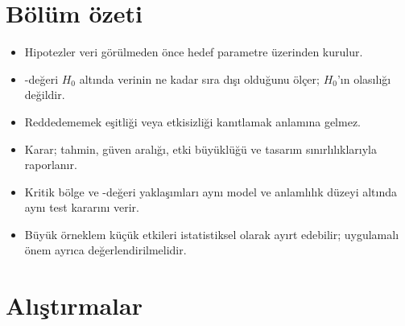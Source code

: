 



\section{Bölüm özeti}

\begin{itemize}
  \item Hipotezler veri görülmeden önce hedef parametre üzerinden kurulur.
  \item \pval-değeri $H_0$ altında verinin ne kadar sıra dışı olduğunu ölçer; $H_0$'ın olasılığı değildir.
  \item Reddedememek eşitliği veya etkisizliği kanıtlamak anlamına gelmez.
  \item Karar; tahmin, güven aralığı, etki büyüklüğü ve tasarım sınırlılıklarıyla raporlanır.
  \item Kritik bölge ve \pval-değeri yaklaşımları aynı model ve anlamlılık düzeyi
  altında aynı test kararını verir.
  \item Büyük örneklem küçük etkileri istatistiksel olarak ayırt edebilir;
  uygulamalı önem ayrıca değerlendirilmelidir.
\end{itemize}

\section*{Alıştırmalar}

